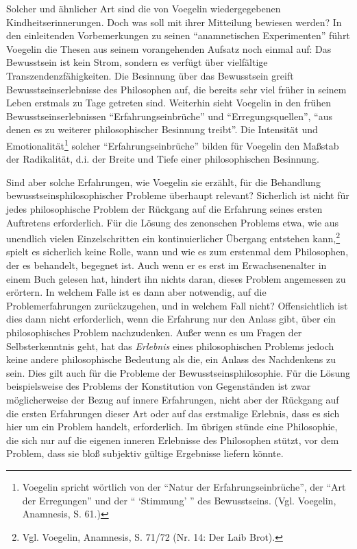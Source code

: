 Solcher und ähnlicher Art sind die von Voegelin wiedergegebenen
Kindheitserinnerungen. Doch was soll mit ihrer Mitteilung bewiesen werden? In
den einleitenden Vorbemerkungen zu seinen "`anamnetischen Experimenten"' führt
Voegelin die Thesen aus seinem vorangehenden Aufsatz noch einmal auf: Das
Bewusstsein ist kein Strom, sondern es verfügt über vielfältige
Transzendenzfähigkeiten.  Die Besinnung über das Bewusstsein greift
Bewusstseinserlebnisse des Philosophen auf, die bereits sehr viel früher in
seinem Leben erstmals zu Tage getreten sind. Weiterhin sieht Voegelin in den
frühen Bewusstseinserlebnissen "`Erfahrungseinbrüche"' und
"`Erregungsquellen"', "`aus denen es zu weiterer philosophischer Besinnung
treibt"'. Die Intensität und Emotionalität\footnote{Voegelin spricht wörtlich
  von der "`Natur der Erfahrungseinbrüche"', der "`Art der Erregungen"' und
  der "` `Stimmung' "' des Bewusstseins. (Vgl. Voegelin, Anamnesis, S. 61.)}
solcher "`Erfahrungseinbrüche"' bilden für Voegelin den Maßstab der
Radikalität, d.i.  der Breite und Tiefe einer philosophischen Besinnung.

Sind aber solche Erfahrungen, wie Voegelin sie erzählt, für die Behandlung
bewusstseinsphilosophischer Probleme überhaupt relevant? Sicherlich ist nicht
für jedes philosophische Problem der Rückgang auf die Erfahrung seines ersten
Auftretens erforderlich. Für die Lösung des zenonschen Problems etwa, wie aus
unendlich vielen Einzelschritten ein kontinuierlicher Übergang entstehen
kann,\footnote{Vgl. Voegelin, Anamnesis, S. 71/72 (Nr. 14: Der Laib Brot).}
spielt es sicherlich keine Rolle, wann und wie es zum erstenmal dem
Philosophen, der es behandelt, begegnet ist.  Auch wenn er es erst im
Erwachsenenalter in einem Buch gelesen hat, hindert ihn nichts daran, dieses
Problem angemessen zu erörtern. In welchem Falle ist es dann aber notwendig,
auf die Problemerfahrungen zurückzugehen, und in welchem Fall nicht?
Offensichtlich ist dies dann nicht erforderlich, wenn die Erfahrung nur den
Anlass gibt, über ein philosophisches Problem nachzudenken. Außer wenn es um
Fragen der Selbsterkenntnis geht, hat das {\em Erlebnis} eines philosophischen
Problems jedoch keine andere philosophische Bedeutung als die, ein Anlass des
Nachdenkens zu sein. Dies gilt auch für die Probleme der
Bewusstseinsphilosophie. Für die Lösung beispielsweise des Problems der
Konstitution von Gegenständen ist zwar möglicherweise der Bezug auf innere
Erfahrungen, nicht aber der Rückgang auf die ersten Erfahrungen dieser Art
oder auf das erstmalige Erlebnis, dass es sich hier um ein Problem handelt,
erforderlich. Im übrigen stünde eine Philosophie, die sich nur auf die eigenen
inneren Erlebnisse des Philosophen stützt, vor dem Problem, dass sie bloß
subjektiv gültige Ergebnisse liefern könnte.

